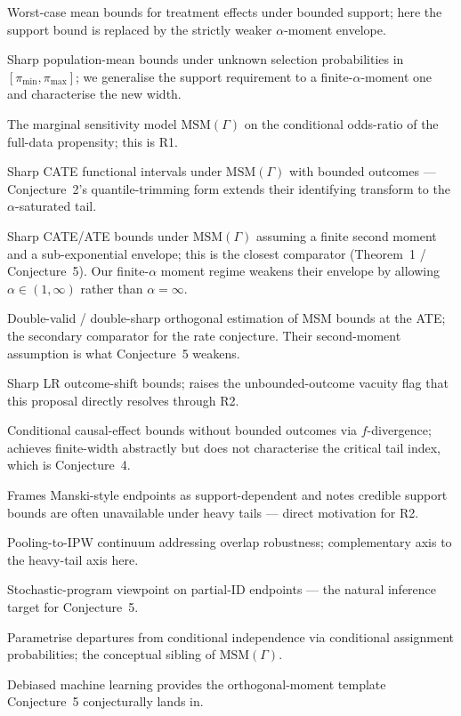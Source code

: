\documentclass[11pt]{article}
\theoremstyle{definition}
\theoremstyle{plain}
\theoremstyle{remark}
\begin{document}
\begin{description}[leftmargin=0em,style=nextline]
  \item[\citet{Manski1990}] Worst-case mean bounds for treatment effects under bounded support; here the support bound is replaced by the strictly weaker $\alpha$-moment envelope.
  \item[\citet{AronowLee2013}] Sharp population-mean bounds under unknown selection probabilities in $[\pi_{\min},\pi_{\max}]$; we generalise the support requirement to a finite-$\alpha$-moment one and characterise the new width.
  \item[\citet{Tan2006}] The marginal sensitivity model $\mathrm{MSM}(\Gamma)$ on the conditional odds-ratio of the full-data propensity; this is R1.
  \item[\citet{KallusMaoZhou2019CATEIntervals}] Sharp CATE functional intervals under $\mathrm{MSM}(\Gamma)$ with bounded outcomes — Conjecture~2's quantile-trimming form extends their identifying transform to the $\alpha$-saturated tail.
  \item[\citet{YadlowskyNamkoongBasuDuchiTian2022}] Sharp CATE/ATE bounds under $\mathrm{MSM}(\Gamma)$ assuming a finite second moment and a sub-exponential envelope; this is the closest comparator (Theorem~1 / Conjecture~5). Our finite-$\alpha$ moment regime weakens their envelope by allowing $\alpha \in (1, \infty)$ rather than $\alpha = \infty$.
  \item[\citet{DornGuoKallus2025}] Double-valid / double-sharp orthogonal estimation of MSM bounds at the ATE; the secondary comparator for the rate conjecture. Their second-moment assumption is what Conjecture~5 weakens.
  \item[\citet{AsiaeePalBeckHuling2026SharpGeneralization}] Sharp LR outcome-shift bounds; raises the unbounded-outcome vacuity flag that this proposal directly resolves through R2.
  \item[\citet{JungKang2026ITBounds}] Conditional causal-effect bounds without bounded outcomes via $f$-divergence; achieves finite-width abstractly but does not characterise the critical tail index, which is Conjecture~4.
  \item[\citet{LordanSalehzadehNobari2026TailUncertainty}] Frames Manski-style endpoints as support-dependent and notes credible support bounds are often unavailable under heavy tails — direct motivation for R2.
  \item[\citet{LeeWeidner2021PoolingBounds}] Pooling-to-IPW continuum addressing overlap robustness; complementary axis to the heavy-tail axis here.
  \item[\citet{TudballBowdenHughesTilling2023SampleConstrained}] Stochastic-program viewpoint on partial-ID endpoints — the natural inference target for Conjecture~5.
  \item[\citet{MastenPoirier2018}] Parametrise departures from conditional independence via conditional assignment probabilities; the conceptual sibling of $\mathrm{MSM}(\Gamma)$.
  \item[\citet{ChernozhukovEtAl2018DML}] Debiased machine learning provides the orthogonal-moment template Conjecture~5 conjecturally lands in.
\end{description}
\end{document}
